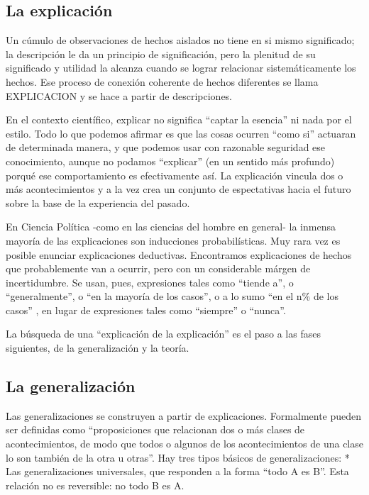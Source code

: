 \documentclass[
]{book}
\begin{document}
\hypertarget{la-explicaciuxf3n}{%
\subsection*{La explicación}\label{la-explicaciuxf3n}}

Un cúmulo de observaciones de hechos aislados no tiene en si mismo significado; la descripción le da un principio de significación, pero la plenitud de su significado y utilidad la alcanza cuando se lograr relacionar sistemáticamente los hechos. Ese proceso de conexión coherente de hechos diferentes se llama EXPLICACION y se hace a partir de descripciones.

En el contexto científico, explicar no significa ``captar la esencia'' ni nada por el estilo. Todo lo que podemos afirmar es que las cosas ocurren ``como si'' actuaran de determinada manera, y que podemos usar con razonable seguridad ese conocimiento, aunque no podamos ``explicar'' (en un sentido más profundo) porqué ese comportamiento es efectivamente así. La explicación vincula dos o más acontecimientos y a la vez crea un conjunto de espectativas hacia el futuro sobre la base de la experiencia del pasado.

En Ciencia Política -como en las ciencias del hombre en general- la inmensa mayoría de las explicaciones son inducciones probabilísticas. Muy rara vez es posible enunciar explicaciones deductivas. Encontramos explicaciones de hechos que probablemente van a ocurrir, pero con un considerable márgen de incertidumbre. Se usan, pues, expresiones tales como ``tiende a'', o ``generalmente'', o ``en la mayoría de los casos'', o a lo sumo ``en el n\% de los casos'' , en lugar de expresiones tales como ``siempre'' o ``nunca''.

La búsqueda de una ``explicación de la explicación'' es el paso a las fases siguientes, de la generalización y la teoría.

\hypertarget{la-generalizaciuxf3n}{%
\subsection*{La generalización}\label{la-generalizaciuxf3n}}

Las generalizaciones se construyen a partir de explicaciones. Formalmente pueden ser definidas como ``proposiciones que relacionan dos o más clases de acontecimientos, de modo que todos o algunos de los acontecimientos de una clase lo son también de la otra u otras''. Hay tres tipos básicos de generalizaciones: * Las generalizaciones universales, que responden a la forma ``todo A es B''. Esta relación no es reversible: no todo B es A.
\end{document}
